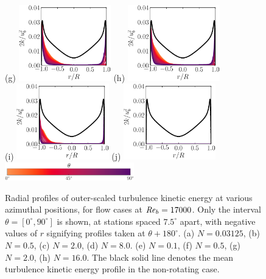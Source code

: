 \documentclass[lineno]{jfm}
\begin{document}
\begin{figure}
               (g) \includegraphics[width=4cm]{Figures/prof_tkeouter_rotz0_roty0.1875.eps}
               (h) \includegraphics[width=4cm]{Figures/prof_tkeouter_rotz0_roty0.25.eps} \\
               (i) \includegraphics[width=4cm]{Figures/prof_tkeouter_rotz0_roty0.5.eps}
               (j) \includegraphics[width=4cm]{Figures/prof_tkeouter_rotz0_roty1.0.eps} \\
               \includegraphics[width=0.5\textwidth]{Figures/theta_cmap_half.eps} \\
       \caption{
               Radial profiles of 
               outer-scaled turbulence kinetic energy
               at various azimuthal positions, 
               for flow cases at $\mbox{\textit{Re}}_b=17000$.
               Only the interval $\theta = [0^{\circ},90^{\circ}]$ is shown, at stations
               spaced $7.5^\circ$ apart, with negative values of $r$ signifying profiles
               taken at $\theta + 180^{\circ}$.
               (a) $N = 0.03125$,
               (b) $N = 0.5$,
               (c) $N = 2.0$,
               (d) $N = 8.0$.
               (e) $N = 0.1$,
               (f) $N = 0.5$,
               (g) $N = 2.0$,
               (h) $N = 16.0$.
               The black solid line denotes the mean turbulence kinetic energy profile in the
               non-rotating case.
               }
               \label{fig:tke}
       \end{figure}
       
\end{document}
